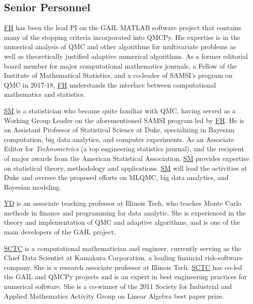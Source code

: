 \documentclass[11pt]{NSFamsart}
\newcommand{\FH}{\hyperlink{FHlink}{FH}\xspace}
\newcommand{\SM}{\hyperlink{SMlink}{SM}\xspace}
\newcommand{\SCTC}{\hyperlink{SCTClink}{SCTC}\xspace}
\newcommand{\YD}{\hyperlink{YDlink}{YD}\xspace}
\begin{document}
\subsection{Senior Personnel}
\FH has been the lead PI on the GAIL \cite{ChoEtal21a} MATLAB software project that contains many of the stopping criteria incorporated into QMCPy.  His expertise is in the numerical analysis of QMC and other algorithms for multivariate problems as well as theoretically justified adaptive numerical algorithms.  As a former editorial board member for major computational mathematics journals, a Fellow of the Institute of Mathematical Statistics, and a co-leader of SAMSI's program on QMC in 2017-18, \FH understands the interface between computational mathematics and statistics.

\SM is a statistician who became quite familiar with QMC, having served as a Working Group Leader on the aforementioned SAMSI program led by \FH. He is an Assistant Professor of Statistical Science at Duke, specializing in Bayesian computation, big data analytics, and computer experiments. As an Associate Editor for \textit{Technometrics} (a top engineering statistics journal), and the recipient of major awards from the American Statistical Association, \SM provides expertise on statistical theory, methodology and applications. \SM will lead the activities at Duke and oversee the proposed efforts on MLQMC, big data analytics, and Bayesian modeling.


\YD is an associate teaching professor at Illinois Tech, who teaches Monte Carlo methods in finance and programming for data analytic. She is experienced in the theory and implementation of QMC and adaptive algorithms, and is one of the main developers of the GAIL project.


\SCTC is a computational mathematician and engineer, currently serving as the Chief Data Scientist at Kamakura Corporation, a leading financial risk-software company.  She is a research associate professor at Illinois Tech.  \SCTC has co-led the GAIL and QMCPy projects and is an expert in best engineering practices for numerical software.  She is a co-winner of the 2011 Society for Industrial and Applied Mathematics Activity Group on Linear Algebra best paper prize.
\end{document}
